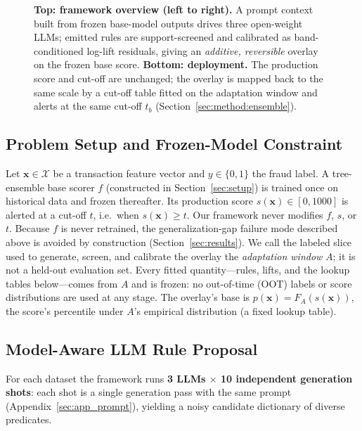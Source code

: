 \documentclass[11pt]{article}
\begin{document}
\begin{figure}[t]
{}
\caption{\textbf{Top: framework overview (left to right).}
  A prompt context built from frozen base-model outputs drives three open-weight LLMs; emitted rules
  are support-screened and calibrated as band-conditioned log-lift
  residuals, giving an \emph{additive, reversible} overlay on the frozen base score.
  \textbf{Bottom: deployment.} The production score and cut-off are unchanged; the overlay is mapped
  back to the same scale by a cut-off table fitted on the adaptation window and alerts at the same
  cut-off $t_b$ (Section~\ref{sec:method:ensemble}).}
\label{fig:framework}
\end{figure}

\subsection{Problem Setup and Frozen-Model Constraint}
\label{sec:method:setup}

Let $\mathbf{x}\in\mathcal{X}$ be a transaction feature vector and $y\in\{0,1\}$ the fraud label.
A tree-ensemble base scorer $f$ (constructed in Section~\ref{sec:setup}) is trained once on
historical data and frozen thereafter. Its production score $s(\mathbf{x})\in[0,1000]$ is alerted
at a cut-off $t$, i.e.\ when $s(\mathbf{x})\ge t$. Our framework never modifies $f$, $s$, or $t$.
Because $f$ is never retrained, the generalization-gap failure mode described above is avoided by
construction (Section~\ref{sec:results}).
We call the labeled slice used to generate, screen, and calibrate the overlay the
\emph{adaptation window} $A$; it is not a held-out evaluation set. Every fitted quantity---rules,
lifts, and the lookup tables below---comes from $A$ and is frozen: no out-of-time (OOT) labels or
score distributions are used at any stage. The overlay's base is $p(\mathbf{x})=F_A(s(\mathbf{x}))$,
the score's percentile under $A$'s empirical distribution (a fixed lookup table).

\subsection{Model-Aware LLM Rule Proposal}
\label{sec:method:adv}

For each dataset the framework runs \textbf{3 LLMs $\times$ 10 independent generation shots}: each
shot is a single generation pass with the same prompt (Appendix~\ref{sec:app_prompt}), yielding a
noisy candidate dictionary of diverse predicates.
\end{document}
